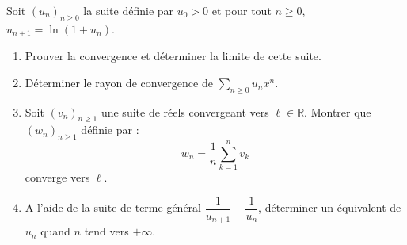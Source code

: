 \documentclass[a4paper,twoside,french,11pt]{VcCours}
\begin{document}
\begin{Exercice}{} Soit $(u_n)_{n \geq 0}$ la suite définie par $u_0 >0$ et pour tout $n \geq 0$, $u_{n+1}= \ln(1+u_n)$.
\begin{enumerate}
\item Prouver la convergence et déterminer la limite de cette suite.
\item Déterminer le rayon de convergence de $\sum_{n \geq 0} u_n x^n$.
\item Soit $(v_n)_{n \geq 1}$ une suite de réels convergeant vers $\ell \in \mathbb{R}$. Montrer que $(w_n)_{n \geq 1}$ définie par :
$$ w_n = \dfrac{1}{n} \sum_{k=1}^n v_k$$
converge vers $\ell$.
\item A l'aide de la suite de terme général $\dfrac{1}{u_{n+1}} - \dfrac{1}{u_n}$, déterminer un équivalent de $u_n$ quand $n$ tend vers $+ \infty$.
\end{enumerate}
\end{Exercice}

\newpage
\end{document}

